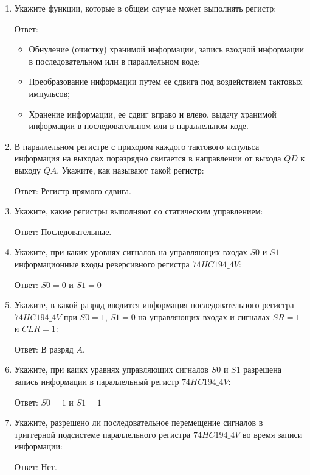 \documentclass[spec, och, labwork]{shiza}
\begin{document}
  \begin{enumerate}
    \item Укажите функции, которые в общем случае может выполнять регистр:
    
    Ответ: 
    \begin{itemize}
      \item Обнуление (очистку) хранимой информации, запись входной информации в последовательном или в параллельном коде;
      \item Преобразование информации путем ее сдвига под воздействием тактовых импульсов;
      \item Хранение информации, ее сдвиг вправо и влево, выдачу хранимой информации в последовательном или в параллельном коде.
    \end{itemize}

    \item В параллельном регистре с приходом каждого тактового испульса информация на выходах поразрядно свигается в направлении от выхода $QD$ к выходу $QA$. Укажите, как называют такой регистр:
    
    Ответ: Регистр прямого сдвига.

    \item Укажите, какие регистры выполняют со статическим управлением:
    
    Ответ: Последовательные.

    \item Укажите, при каких уровнях сигналов на управляющих входах $S0$ и $S1$ информационные входы реверсивного регистра $74HC194\_4V$:
  
    Ответ: $S0 = 0$ и $S1 = 0$

    \item Укажите, в какой разряд вводится информация последовательного регистра $74HC194\_4V$ при $S0 = 1$, $S1 = 0$ на управляющих входах и сигналах $SR = 1$ и $CLR = 1$:
  
    Ответ: В разряд $A$.

    \item Укажите, при каикх уравнях управляющих сигналов $S0$ и $S1$ разрешена запись информации в параллельный регистр $74HC194\_4V$:
    
    Ответ: $S0 = 1$ и $S1 = 1$

    \item Укажите, разрешено ли последовательное перемещение сигналов в триггерной подсистеме параллельного регистра $74HC194\_4V$ во время записи информации:
    
    Ответ: Нет.


\end{enumerate}
\end{document}
